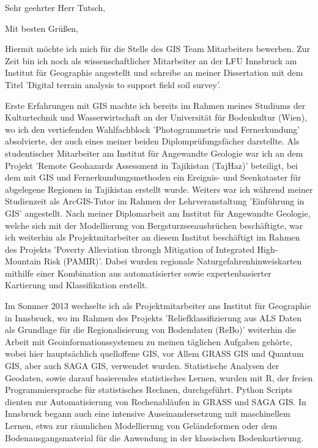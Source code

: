 \documentclass[11pt,a4paper,sans]{moderncv}        %
\begin{document}

\date{15. Dezember, 2018}
\opening{Sehr geehrter Herr Tutsch,}
\closing{Mit besten Gr\"{u}{\ss}en,}

\makelettertitle
\justify
Hiermit m\"ochte ich mich f\"ur die Stelle des GIS Team Mitarbeiters bewerben. Zur Zeit bin ich noch als wissenschaftlicher Mitarbeiter an der LFU Innsbruck am Institut f\"ur Geographie angestellt und schreibe an meiner Dissertation mit dem Titel 'Digital terrain analysis to support field soil survey'.

Erste Erfahrungen mit GIS machte ich bereits im Rahmen meines Studiums der Kulturtechnik und Wasserwirtschaft an der Universit\"at f\"ur Bodenkultur (Wien), wo ich  den vertiefenden Wahlfachblock 'Photogrammetrie und Fernerkundung'  absolvierte, der auch eines meiner beiden Diplompr\"ufungsf\"acher darstellte. Als studentischer Mitarbeiter am Institut f\"ur Angewandte Geologie war ich an dem Projekt 'Remote Geohazards Assessment in Tajikistan (TajHaz)' beteiligt, bei dem mit GIS und Fernerkundungsmethoden ein Ereignis- und Seenkataster f\"ur abgelegene Regionen in Tajikistan erstellt wurde. Weiters war ich w\"ahrend meiner Studienzeit als ArcGIS-Tutor im Rahmen der Lehrveranstaltung 'Einf\"uhrung in GIS' angestellt. Nach meiner Diplomarbeit am Institut f\"ur Angewandte Geologie, welche sich mit der Modellierung von Bergsturzseeausbr\"uchen  besch\"aftigte, war ich weiterhin als Projektmitarbeiter an diesem Institut besch\"aftigt im Rahmen des Projekts 'Poverty Alleviation through Mitigation of Integrated High-Mountain Risk (PAMIR)'. Dabei wurden regionale Naturgefahrenhinweiskarten mithilfe einer Kombination aus automatisierter sowie expertenbasierter Kartierung und Klassifikation erstellt.

Im Sommer 2013 wechselte ich als Projektmitarbeiter ans Institut f\"ur Geographie in Innsbruck, wo  im Rahmen des Projekts 'Reliefklassifizierung aus ALS Daten als Grundlage f\"ur die Regionalisierung von Bodendaten (ReBo)' weiterhin die Arbeit mit Geoinformationssystemen zu meinen t\"aglichen Aufgaben geh\"orte, wobei hier haupts\"achlich quelloffene GIS, vor Allem GRASS GIS und Quantum GIS, aber auch SAGA GIS, verwendet wurden. Statistische Analysen der Geodaten, sowie darauf basierendes statistisches Lernen, wurden mit R, der freien Programmiersprache f\"{u}r statistisches Rechnen, durchgef\"uhrt. Python Scripts dienten zur Automatisierung von Rechenabl\"aufen in GRASS und SAGA GIS. In Innsbruck begann auch eine intensive Auseinandersetzung mit maschinellem Lernen, etwa zur r\"aumlichen Modellierung von Gel\"andeformen  oder dem Bodenausgangsmaterial f\"ur die Anwendung in der klassischen Bodenkartierung. 
\end{document}
